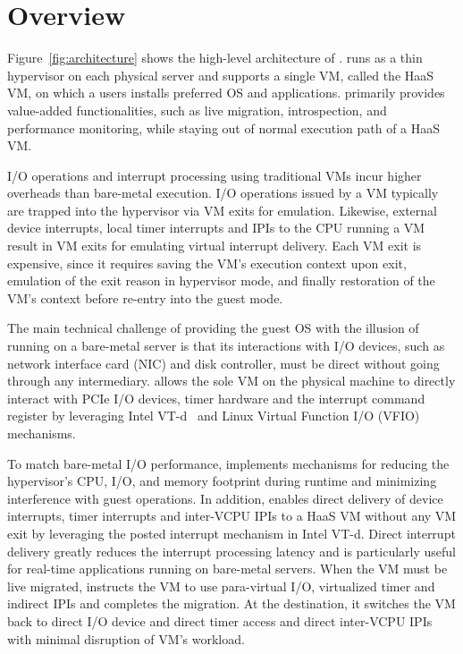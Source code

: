 \section{\na Overview}


Figure~\ref{fig:architecture} shows the high-level
architecture of \na. \na runs as a thin hypervisor on each
physical server and supports a single VM, called the HaaS VM,
on which a users installs preferred OS and applications. \na
primarily provides value-added functionalities, such as live
migration, introspection, and performance monitoring, while
staying out of normal execution path of a HaaS VM.

I/O operations and interrupt processing using traditional VMs
incur higher overheads than bare-metal execution. I/O
operations issued by a VM typically are trapped into the
hypervisor via VM exits for emulation. Likewise, external
device interrupts, local timer interrupts and IPIs to the CPU
running a VM result in VM exits for emulating virtual
interrupt delivery. Each VM exit is expensive, since it
requires saving the VM's execution context upon exit,
emulation of the exit reason in hypervisor mode, and finally
restoration of the VM's context before re-entry into the guest
mode.

The main technical challenge of providing the guest OS with
the illusion of running on a bare-metal server is that its
interactions with I/O devices, such as network interface card
(NIC) and disk controller, must be direct without going
through any intermediary. \na allows the sole VM on the
physical machine to directly interact with PCIe I/O devices,
timer hardware and the interrupt command register by
leveraging Intel VT-d~\cite{intelvtd-paper} and Linux Virtual
Function I/O (VFIO)~\cite{vfio} mechanisms.

To match bare-metal I/O performance, \na implements mechanisms
for reducing the hypervisor's CPU, I/O, and memory footprint
during runtime and minimizing interference with guest
operations. In addition, \na enables direct delivery of device
interrupts, timer interrupts and inter-VCPU IPIs to a HaaS VM
without any VM exit by leveraging the posted interrupt
mechanism in Intel VT-d. Direct interrupt delivery greatly
reduces the interrupt processing latency and is particularly
useful for real-time applications running on bare-metal
servers. When the VM must be live migrated, \na instructs the
VM to use para-virtual I/O, virtualized timer and indirect
IPIs and completes the migration. At the destination, it
switches the VM back to direct I/O device and direct timer
access and direct inter-VCPU IPIs with minimal disruption of
VM's workload.



